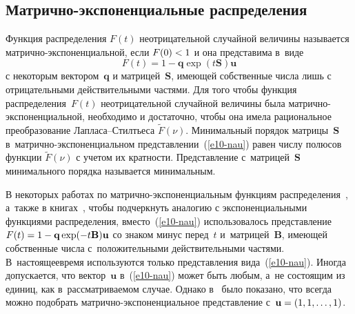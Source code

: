 \begin{multicols}{2}
\section{Матрично-экспоненциальные распределения}

  Функция распределения $F(t)$ неотрицательной случайной величины 
называется мат\-рич\-но-экс\-по\-нен\-ци\-аль\-ной, если $F(0)\hm<1$ и она 
представима в~виде 
  \begin{equation}
  F(t)=1-\mathbf{q}\exp (t\mathbf{S})\mathbf{u}
  \label{e10-nau}
  \end{equation}
с некоторым вектором~$\mathbf{q}$ и матрицей~$\mathbf{S}$, име\-ющей 
собственные числа лишь с отрицательными действительными частями. Для 
того чтобы функция распределения~$F(t)$ неотрицательной случайной 
величины была  
мат\-рич\-но-экс\-по\-нен\-ци\-аль\-ной, необходимо и достаточно, чтобы она 
имела рациональное преобразование 
Лап\-ла\-са--Стилть\-еса $\tilde{F}(\nu)$. Минимальный порядок 
матрицы~$\mathbf{S}$  
в~мат\-рич\-но-экс\-по\-нен\-ци\-аль\-ном представлении~(\ref{e10-nau}) равен 
чис\-лу полюсов функции $\tilde{F}(\nu)$ с учетом их кратности. Представление 
с~матрицей~$\mathbf{S}$ минимального порядка называется минимальным. 

  В некоторых работах по мат\-рич\-но-экс\-по\-нен\-ци\-аль\-ным функциям  
распределения~\cite{22-nau, 23-nau, 24-nau}, а~также в книгах~\cite{25-nau, 26-nau}, 
чтобы подчеркнуть аналогию с экспоненциальными функциями 
\mbox{распределения},  
вмес\-то~(\ref{e10-nau}) использовалось пред\-став\-ле\-ние $F(t)\hm= 1\hm - 
\mathbf{q}\exp (-t\mathbf{B})\mathbf{u}$ со знаком минус перед~$t$ 
и~мат\-ри\-цей~$\mathbf{B}$, име\-ющей собственные чис\-ла с~положительными 
действительными частями. В~настоящее\linebreak время используются только 
представления вида~(\ref{e10-nau}). Иногда допускается, что 
вектор~$\mathbf{u}$ в~(\ref{e10-nau}) может быть любым, а~не состоящим из 
единиц, как в~рас\-смат\-ри\-ва\-емом случае. Однако в~\cite{24-nau, 27-nau} 
было показано, что всегда можно подобрать мат\-рич\-но-экс\-по\-нен\-ци\-аль\-ное 
пред\-став\-ле\-ние с~$\mathbf{u}\hm=(1,1,\ldots , 1)$. 
  

\end{multicols}

